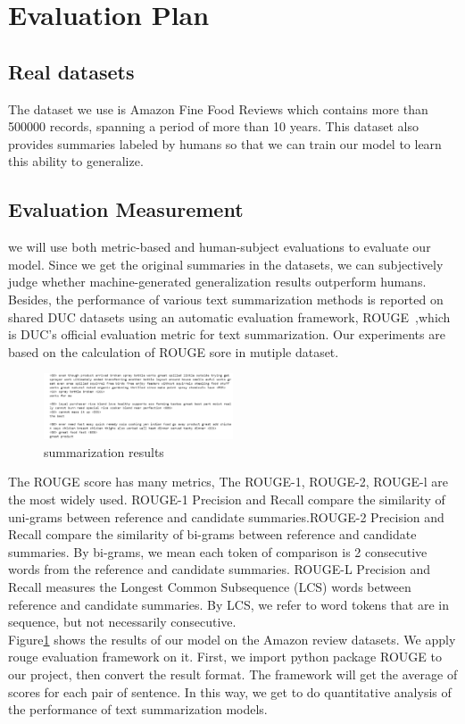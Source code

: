 \documentclass[conference]{IEEEtran}
\begin{document}
\section{Evaluation Plan}
\subsection{Real datasets}
The dataset we use is Amazon Fine Food Reviews which contains more than 500000 records, spanning a period of more than 10 years. This dataset also provides summaries labeled by humans so that we can train our model to learn this ability to generalize. 
\subsection{Evaluation Measurement}
we will use both metric-based and human-subject evaluations to evaluate our model. Since we get the original summaries in the datasets, we can subjectively judge whether machine-generated generalization results outperform humans.  Besides, the performance of various text summarization methods is reported on shared DUC datasets using an automatic evaluation framework, ROUGE~\cite{lin-2004-rouge},which is DUC’s official evaluation metric for text summarization. Our experiments are based on the calculation of ROUGE sore in mutiple dataset.

\begin{figure}[h]
\centering
\includegraphics[width=0.5\textwidth]{imgs/Results.png}
\caption{summarization results}
\label{fig:Results}
\end{figure}
The ROUGE score has many metrics, The ROUGE-1, ROUGE-2, ROUGE-l are the most widely used. ROUGE-1 Precision and Recall compare the similarity of uni-grams between reference and candidate summaries.ROUGE-2 Precision and Recall compare the similarity of bi-grams between reference and candidate summaries. By bi-grams, we mean each token of comparison is 2 consecutive words from the reference and candidate summaries. ROUGE-L Precision and Recall measures the Longest Common Subsequence (LCS) words between reference and candidate summaries. By LCS, we refer to word tokens that are in sequence, but not necessarily consecutive. \\
Figure\ref{fig:Results} shows the results of our model on the Amazon review datasets. We apply rouge evaluation framework on it. First, we import python package ROUGE to our project, then convert the result format. The framework will get the average of scores for each pair of sentence. In this way, we get to do quantitative analysis of the performance of text summarization models.\\
\end{document}
